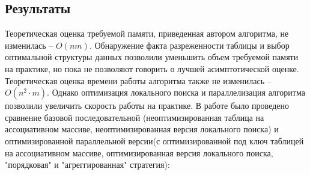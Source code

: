 \documentclass[14pt]{article}
\begin{document}
\subsection{Результаты}

Теоретическая оценка требуемой памяти, приведенная автором алгоритма, не изменилась -- $O(nm)$. Обнаружение факта разреженности таблицы и выбор оптимальной структуры данных позволили уменьшить объем требуемой памяти на практике, но пока не позволяют говорить о лучшей асимптотической оценке. 
Теоретическая оценка времени работы алгоритма также не изменилась -- $O(n^2 \cdot m)$. Однако оптимизация локального поиска и параллелизация алгоритма позволили увеличить скорость работы на практике. 
В работе было проведено сравнение базовой последовательной (неоптимизированная таблица на ассоциативном массиве, неоптимизированная версия локального поиска) и оптимизированной параллельной версии(с оптимизированной под ключ таблицей на ассоциативном массиве, оптимизированная версия локального поиска, "порядковая" и "агреггированная" стратегия):
\end{document}
